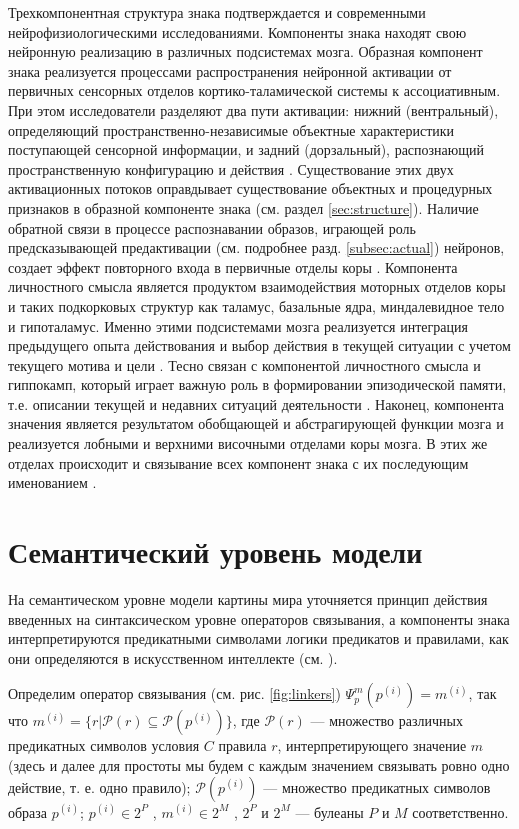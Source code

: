 \documentclass[12pt]{scrartcl}
\begin{document}
	Трехкомпонентная структура знака подтверждается и современными нейрофизиологическими исследованиями. Компоненты знака находят свою нейронную реализацию в различных подсистемах мозга. Образная компонент знака реализуется процессами распространения нейронной активации от первичных сенсорных отделов кортико-таламической системы к ассоциативным. При этом исследователи разделяют два пути активации: нижний (вентральный), определяющий пространственно-независимые объектные характеристики поступающей сенсорной информации, и задний (дорзальный), распознающий пространственную конфигурацию и действия \cite{Grossberg2014}. Существование этих двух активационных потоков оправдывает существование объектных и процедурных признаков в образной компоненте знака (см. раздел \ref{sec:structure}). Наличие обратной связи в процессе распознавании образов, играющей роль предсказывающей предактивации (см. подробнее разд. \ref{subsec:actual}) нейронов, создает эффект повторного входа в первичные отделы коры \cite{Edelmen1981,Ivanitsky1996}. Компонента личностного смысла является продуктом взаимодействия моторных отделов коры и таких подкорковых структур как таламус, базальные ядра, миндалевидное тело и гипоталамус. Именно этими подсистемами мозга реализуется интеграция предыдущего опыта действования и выбор действия в текущей ситуации с учетом текущего мотива и цели \cite{Gurney2001}. Тесно связан с компонентой личностного смысла и гиппокамп, который играет важную роль в формировании эпизодической памяти, т.е. описании текущей и недавних ситуаций деятельности \cite{Rolls2010}. Наконец, компонента значения является результатом обобщающей и абстрагирующей функции мозга и реализуется лобными и верхними височными отделами коры мозга. В этих же отделах происходит и связывание всех компонент знака с их последующим именованием \cite{Friederici2015,Pulvermuller2013}.

	\section{Семантический уровень модели}\label{sec:semantic}
	
	На семантическом уровне модели картины мира уточняется принцип действия введенных на синтаксическом уровне операторов связывания, а компоненты знака интерпретируются предикатными символами логики предикатов и правилами, как они определяются в искусственном интеллекте (см. \cite{Osipov2015c,Osipov2016a}).
	
	Определим оператор связывания (см. рис. \ref{fig:linkers}) $\Psi_p^m(p^{(i)})=m^{(i)}$, так что $m^{(i)}=\{r|\mathcal{P}(r)\subseteq \mathcal{P}(p^{(i)})\}$, где $\mathcal{P}(r)$ --- множество различных предикатных символов условия $C$ правила $r$, интерпретирующего значение $m$ (здесь и далее для простоты мы будем с каждым значением связывать ровно одно действие, т. е. одно правило); $\mathcal{P}(p^{(i)})$ --- множество предикатных символов образа $p^{(i)}$; $p^{(i)}\in 2^P$ , $m^{(i)}\in 2^M$ , $2^P$ и $2^M$ --- булеаны $P$ и $M$ соответственно. 
	
\end{document}
